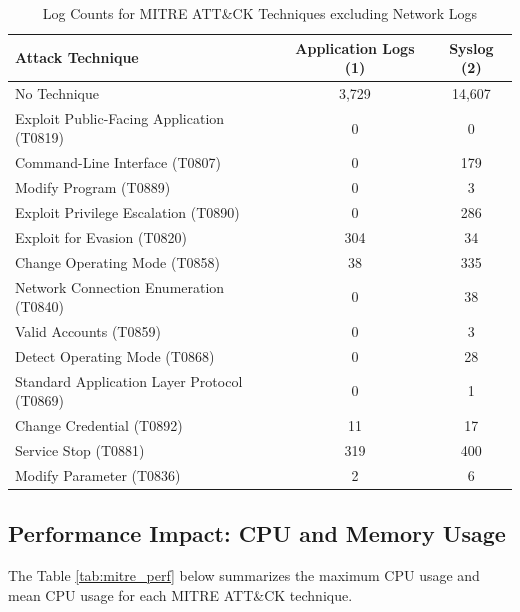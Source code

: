 \documentclass[Master,BMR,english]{twbook}
\begin{document}
\begin{table}[!htbp]
    \centering
    \begin{tabular}{|l|c|c|}
        \hline
        \textbf{Attack Technique} & \textbf{Application Logs (1)} & \textbf{Syslog (2)} \\
        \hline
        No Technique & 3,729 & 14,607 \\
        Exploit Public-Facing Application (T0819) & 0 &0\\
        Command-Line Interface (T0807) & 0 & 179 \\
        Modify Program (T0889) & 0 & 3 \\
        Exploit Privilege Escalation (T0890) & 0 & 286 \\
        Exploit for Evasion (T0820) & 304 & 34 \\
        Change Operating Mode (T0858) & 38 & 335 \\
        Network Connection Enumeration (T0840) & 0 & 38 \\
        Valid Accounts (T0859) & 0 & 3 \\
        Detect Operating Mode (T0868) & 0 & 28 \\
        Standard Application Layer Protocol (T0869) & 0 & 1 \\
        Change Credential (T0892) & 11 & 17 \\
        Service Stop (T0881) & 319 & 400 \\
        Modify Parameter (T0836) & 2 & 6 \\
        \hline
    \end{tabular}
    \caption{Log Counts for MITRE ATT\&CK Techniques excluding Network Logs}
    \label{tab:mitre_impact}
\end{table}



\subsection{Performance Impact: CPU and Memory Usage}

The Table \ref{tab:mitre_perf} below summarizes the maximum CPU usage and mean CPU usage for each MITRE ATT\&CK technique.
\end{document}
